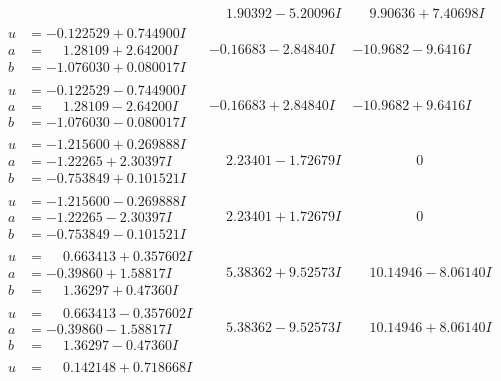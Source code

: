 \documentclass[1p]{elsarticle_modified}
\theoremstyle{definition}
\begin{document}
$$\begin{array}{c|c|c}
 & \phantom{-}1.90392 - 5.20096 I & \phantom{-}9.90636 + 7.40698 I \\ \hline\begin{aligned}
u &= -0.122529 + 0.744900 I \\
a &= \phantom{-}1.28109 + 2.64200 I \\
b &= -1.076030 + 0.080017 I\end{aligned}
 & -0.16683 - 2.84840 I & -10.9682 - 9.6416 I \\ \hline\begin{aligned}
u &= -0.122529 - 0.744900 I \\
a &= \phantom{-}1.28109 - 2.64200 I \\
b &= -1.076030 - 0.080017 I\end{aligned}
 & -0.16683 + 2.84840 I & -10.9682 + 9.6416 I \\ \hline\begin{aligned}
u &= -1.215600 + 0.269888 I \\
a &= -1.22265 + 2.30397 I \\
b &= -0.753849 + 0.101521 I\end{aligned}
 & \phantom{-}2.23401 - 1.72679 I & \phantom{-0.000000 } 0 \\ \hline\begin{aligned}
u &= -1.215600 - 0.269888 I \\
a &= -1.22265 - 2.30397 I \\
b &= -0.753849 - 0.101521 I\end{aligned}
 & \phantom{-}2.23401 + 1.72679 I & \phantom{-0.000000 } 0 \\ \hline\begin{aligned}
u &= \phantom{-}0.663413 + 0.357602 I \\
a &= -0.39860 + 1.58817 I \\
b &= \phantom{-}1.36297 + 0.47360 I\end{aligned}
 & \phantom{-}5.38362 + 9.52573 I & \phantom{-}10.14946 - 8.06140 I \\ \hline\begin{aligned}
u &= \phantom{-}0.663413 - 0.357602 I \\
a &= -0.39860 - 1.58817 I \\
b &= \phantom{-}1.36297 - 0.47360 I\end{aligned}
 & \phantom{-}5.38362 - 9.52573 I & \phantom{-}10.14946 + 8.06140 I \\ \hline\begin{aligned}
u &= \phantom{-}0.142148 + 0.718668 I \\

\end{aligned}
\end{array}$$
\end{document}
